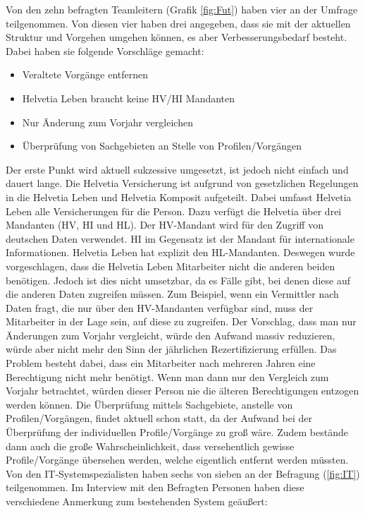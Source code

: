 \newpage
Von den zehn befragten Teamleitern (Grafik \ref{fig:Fut}) haben vier an der Umfrage teilgenommen.
Von diesen vier haben drei angegeben, dass sie mit der aktuellen Struktur und Vorgehen umgehen können, es aber Verbesserungsbedarf besteht.
Dabei haben sie folgende Vorschläge gemacht:

\begin{itemize}
	\item Veraltete Vorgänge entfernen
	\item Helvetia Leben braucht keine HV/HI Mandanten
	\item Nur Änderung zum Vorjahr vergleichen
	\item Überprüfung von Sachgebieten an Stelle von Profilen/Vorgängen
\end{itemize}

Der erste Punkt wird aktuell sukzessive umgesetzt, ist jedoch nicht einfach und dauert lange.
Die Helvetia Versicherung ist aufgrund von gesetzlichen Regelungen in die Helvetia Leben und Helvetia Komposit aufgeteilt.
Dabei umfasst Helvetia Leben alle Versicherungen für die Person.
Dazu verfügt die Helvetia über drei Mandanten (HV, HI und HL).
Der HV-Mandant wird für den Zugriff von deutschen Daten verwendet.
HI im Gegensatz ist der Mandant für internationale Informationen.
Helvetia Leben hat explizit den HL-Mandanten.
Deswegen wurde vorgeschlagen, dass die Helvetia Leben Mitarbeiter nicht die anderen beiden benötigen.
Jedoch ist dies nicht umsetzbar, da es Fälle gibt, bei denen diese auf die anderen Daten zugreifen müssen.
Zum Beispiel, wenn ein Vermittler nach Daten fragt, die nur über den HV-Mandanten verfügbar sind, muss der Mitarbeiter in der Lage sein, auf diese zu zugreifen.
\newline
Der Vorschlag, dass man nur Änderungen zum Vorjahr vergleicht, würde den Aufwand massiv reduzieren, würde aber nicht mehr den Sinn der jährlichen Rezertifizierung erfüllen.
Das Problem besteht dabei, dass ein Mitarbeiter nach mehreren Jahren eine Berechtigung nicht mehr benötigt.
Wenn man dann nur den Vergleich zum Vorjahr betrachtet, würden dieser Person nie die älteren Berechtigungen entzogen werden können.
\newline
Die Überprüfung mittels Sachgebiete, anstelle von Profilen/Vorgängen, findet aktuell schon statt, da der Aufwand bei der Überprüfung der individuellen Profile/Vorgänge zu groß wäre.
Zudem bestände dann auch die große Wahrscheinlichkeit, dass versehentlich gewisse Profile/Vorgänge übersehen werden, welche eigentlich entfernt werden müssten.
\newline
\newline
Von den IT-Systemspezialisten haben sechs von sieben an der Befragung (\ref{fig:IT}) teilgenommen.
Im Interview mit den Befragten Personen haben diese verschiedene Anmerkung zum bestehenden System geäußert:

